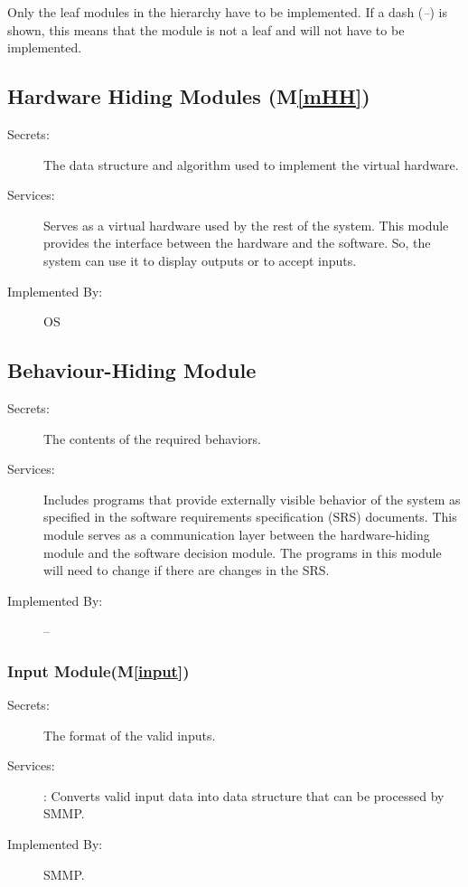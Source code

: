 \documentclass[12pt, titlepage]{article}
\newcommand{\mref}[1]{M\ref{#1}}
\begin{document}
Only the leaf modules in the hierarchy have to be implemented. If a dash
(\emph{--}) is shown, this means that the module is not a leaf and will not have
to be implemented.

\subsection{Hardware Hiding Modules (\mref{mHH})}
\begin{description}
\item[Secrets:]The data structure and algorithm used to implement the virtual
  hardware.
\item[Services:]Serves as a virtual hardware used by the rest of the
  system. This module provides the interface between the hardware and the
  software. So, the system can use it to display outputs or to accept inputs.
\item[Implemented By:] OS
\end{description}

\subsection{Behaviour-Hiding Module}

\begin{description}
\item[Secrets:]The contents of the required behaviors.
\item[Services:]Includes programs that provide externally visible behavior of
  the system as specified in the software requirements specification (SRS)
  documents. This module serves as a communication layer between the
  hardware-hiding module and the software decision module. The programs in this
  module will need to change if there are changes in the SRS.
\item[Implemented By:] --
\end{description}



\subsubsection{Input Module(\mref{input})}

\begin{description}
\item[Secrets:] The format of the valid inputs.
\item[Services:]: Converts valid input data into data structure that can be processed by SMMP.
\item[Implemented By:] SMMP.
\end{description}
\end{document}
